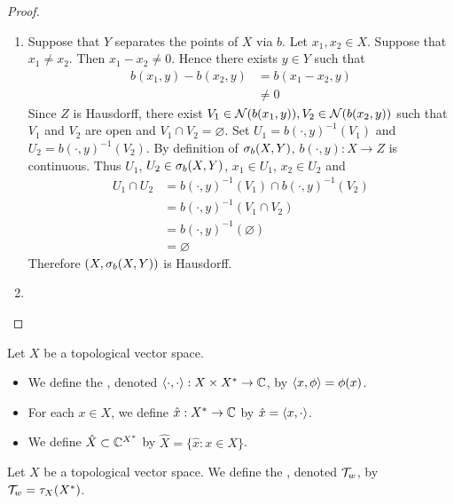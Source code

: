 \documentclass{book}
\begin{document}
	\begin{proof} \
		\begin{enumerate}
			\item Suppose that $Y$ separates the points of $X$ via $b$. Let $x_1, x_2 \in X$. Suppose that $x_1 \neq x_2$. Then $x_1 - x_2 \neq 0$. Hence there exists $y \in Y$ such that 
			\begin{align*}
				b(x_1, y) - b(x_2,y)
				& = b(x_1 - x_2,y) \\
				& \neq 0
			\end{align*}
			 Since $Z$ is Hausdorff, there exist $V_1 \in \mathcal{N}(b(x_1, y)), V_2 \in \mathcal{N}(b(x_2, y))$ such that $V_1$ and $V_2$ are open and $V_1 \cap V_2 = \varnothing$. Set $U_1 = b(\cdot, y)^{-1}(V_1)$ and $U_2 = b(\cdot, y)^{-1}(V_2)$. By definition of $\sigma_b(X,Y)$, $b(\cdot, y): X \rightarrow Z$ is continuous. Thus $U_1$, $U_2 \in \sigma_b(X,Y)$, $x_1 \in U_1$, $x_2 \in U_2$ and 
			 \begin{align*}
			 	U_1 \cap U_2
			 	& = b(\cdot, y)^{-1}(V_1) \cap b(\cdot, y)^{-1}(V_2) \\
			 	& = b(\cdot, y)^{-1}(V_1 \cap V_2) \\
			 	& = b(\cdot, y)^{-1}(\varnothing) \\
			 	& = \varnothing
			 \end{align*}
		 	Therefore $(X, \sigma_b(X,Y))$ is Hausdorff. \\
			\item 
		\end{enumerate}
	\end{proof}

	\begin{defn}
		Let $X$ be a topological vector space. 
		\begin{itemize}
			\item We define the , denoted $\langle \cdot, \cdot \rangle: X \times X^* \rightarrow \mathbb{C}$, by $\langle x, \phi \rangle = \phi(x)$. 
			\item For each $x \in X$, we define $\hat{x}:X^* \rightarrow \mathbb{C}$ by $\hat{x} = \langle x, \cdot \rangle$.
			\item We define $\hat{X} \subset \mathbb{C}^{X^*}$ by $\hat{X} = \{\hat{x}: x \in X\}$.
		\end{itemize}
	\end{defn}

	\begin{defn}
		Let $X$ be a topological vector space. We define the , denoted $\mathcal{T}_w$, by $\mathcal{T}_w = \tau_X(X^*)$.
	\end{defn}
\end{document}
